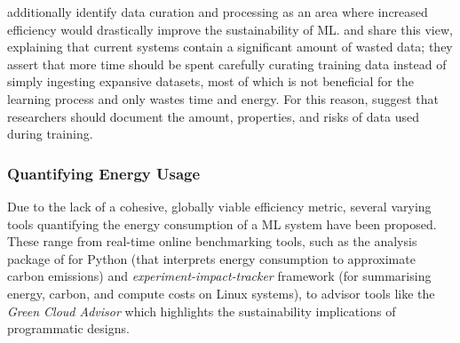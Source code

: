 \documentclass[a4paper, 12pt]{article}
\begin{document}
     additionally identify data curation and processing as an area where increased efficiency would drastically improve the sustainability of ML.  and  share this view, explaining that current systems contain a significant amount of wasted data; they assert that more time should be spent carefully curating training data instead of simply ingesting expansive datasets, most of which is not beneficial for the learning process and only wastes time and energy. For this reason,  suggest that researchers should document the amount, properties, and risks of data used during training.

    \subsubsection{Quantifying Energy Usage}

    Due to the lack of a cohesive, globally viable efficiency metric, several varying tools quantifying the energy consumption of a ML system have been proposed. These range from real-time online benchmarking tools, such as the analysis package of  for Python (that interprets energy consumption to approximate carbon emissions) and \emph{experiment-impact-tracker} framework \cite{henderson-2020} (for summarising energy, carbon, and compute costs on Linux systems), to advisor tools like the \emph{Green Cloud Advisor} \cite{sharma-kaulgud-2021} which highlights the sustainability implications of programmatic designs.
\end{document}

